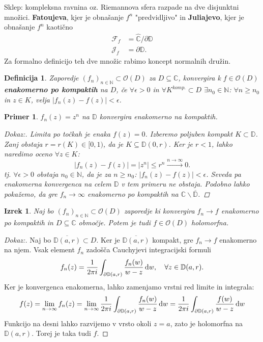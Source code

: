 \documentclass{article}
\newtheorem{definicija}{Definicija}
\newtheorem{primer}{Primer}
\newtheorem{izrek}{Izrek}
\newcommand{\C}{\mathbb{C}}
\newcommand{\D}{\mathbb{D}}
\newcommand{\N}{\mathbb{N}}
\newcommand{\Ho}{\mathcal{O}}
\begin{document}
\noindent
Sklep: kompleksna ravnina oz. Riemannova sfera razpade na dve disjunktni množici. \textbf{Fatoujeva}, kjer je obnašanje $f^n$ "predvidljivo" in \textbf{Juliajevo}, kjer je obnašanje $f^n$ kaotično 
\begin{align*}
\mathcal{F}_f &= \hat{\C} \slash \partial \D \\ 
\mathcal{J}_f &= \partial \D.
\end{align*}
Za formalno definicijo teh dve množic rabimo koncept normalnih družin.

\begin{definicija}
Zaporedje $(f_n)_{n\in\N} \subset \Ho(D)$ za $D \subseteq \C$, konvergira k $f \in \Ho(D)$ \textbf{enakomerno po kompaktih} na $D$, če $\forall \epsilon > 0$ in $\forall K^{komp.} \subset D$ $\exists n_0\in \N$: $\forall n \geq n_0$ in $z\in K$, velja $|f_n(z) - f(z)| < \epsilon$.
\end{definicija}

\begin{primer}
$f_n(z) = z^n$ na $\D$ konvergira enakomerno na kompaktih.
\begin{proof}[Dokaz:]
    Limita po točkah je enaka $f(z) = 0$. Izberemo poljuben kompakt $K\subset \D$.
    Zanj obstaja $r = r(K) \in [0, 1)$, da je $K \subseteq \D(0, r)$. Ker je $r < 1$, lahko naredimo oceno $\forall z\in K$:
    $$
    |f_n(z) - f(z)| = |z^n| \leq r^n \xrightarrow{n\rightarrow \infty} 0.
    $$
    tj. $\forall \epsilon > 0$ obstaja $n_0 \in \N$, da je za $n \geq n_0$: $|f_n(z) - f(z)| < \epsilon$. 
    Seveda pa enakomerna konvergenca na celem $\D$ v tem primeru ne 
    obstaja. Podobno lahko pokažemo, da gre $f_n \rightarrow \infty$ 
    enakomerno po kompaktih na $\C\backslash \overline{\D}$.
\end{proof}
\end{primer}

\begin{izrek}
Naj bo $(f_n)_{n\in\N} \subset \Ho(D)$ zaporedje ki konvergira $f_n \rightarrow f$ enakomerno po kompaktih in $D\subseteq \C$ območje. Potem je tudi $f \in \Ho(D)$ holomorfna.
\end{izrek}

\begin{proof}[Dokaz:]
Naj bo $\overline{\D(a, r)} \subset D$. Ker je $\overline{\D(a, r)}$ kompakt, 
gre $f_n \rightarrow f$ enakomerno na njem. Vsak element $f_n$ zadošča 
Cauchyjevi integracijski formuli
$$
f_n(z) = \frac{1}{2\pi i} \int_{\partial \D(a, r)} \frac{f_n(w)}{w - z} \dif w, \quad \forall z\in \D(a, r).
$$
Ker je konvergenca enakomerna, lahko zamenjamo vrstni red limite in integrala: 
$$
f(z) = \lim_{n\rightarrow \infty} f_n(z) = \lim_{n\rightarrow \infty} \frac{1}{2\pi i} \int_{\partial \D(a, r)} \frac{f_n(w)}{w - z} \dif w = \frac{1}{2\pi i} \int_{\partial \D(a, r)} \frac{f(w)}{w - z} \dif w
$$
Funkcijo na desni lahko razvijemo v vrsto okoli $z = a$, zato je holomorfna 
na $\D(a, r)$. Torej je taka tudi $f$.
\end{proof}
\end{document}
